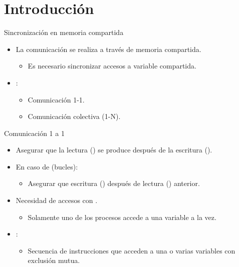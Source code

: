 \section{Introducción}

\begin{frame}[t]{Sincronización en memoria compartida}
\begin{itemize}
  \item La comunicación se realiza a través de memoria compartida.
    \begin{itemize}
      \item Es necesario sincronizar accesos a variable compartida.
    \end{itemize}

  \item {}:
    \begin{itemize}
      \item Comunicación 1-1.
      \item Comunicación colectiva (1-N).
    \end{itemize}
\end{itemize}
\end{frame}

\begin{frame}[t]{Comunicación 1 a 1}
\begin{itemize}
  \item Asegurar que la lectura () se produce después de la
        escritura ().
  
  \item En caso de  (bucles):
    \begin{itemize}
      \item Asegurar que escritura () después de lectura () anterior.
    \end{itemize}

  \item Necesidad de accesos con .
    \begin{itemize}
      \item Solamente uno de los procesos accede a una variable a la vez.
    \end{itemize}

  \item {}:
    \begin{itemize}
      \item Secuencia de instrucciones que acceden a una o varias variables con exclusión mutua.
    \end{itemize}

\end{itemize}
\end{frame}

